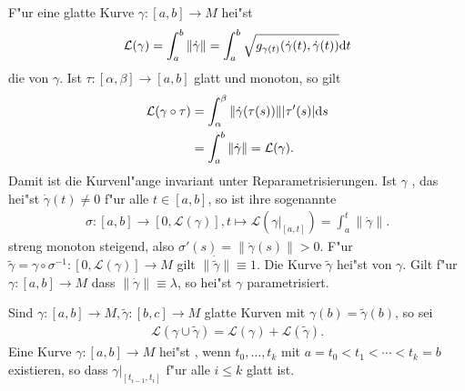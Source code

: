 F"ur eine glatte Kurve $\gamma \colon [a,b] \to M$ hei"st
\begin{align*}
  \mathcal L(\gamma) = \int_{a}^b\|\dot \gamma\| = \int_a^b \sqrt{g_{\gamma(t)}(\dot\gamma(t),\dot\gamma(t))}\mathrm{d} t
\end{align*}
die  von $\gamma$. Ist $\tau \colon [\alpha,\beta] \to [a,b]$ glatt und monoton, so gilt
\begin{align*}
  \mathcal L(\gamma \circ \tau) & = \int_{\alpha}^{\beta}\|\dot\gamma(\tau(s))\||\tau'(s)|\mathrm{d} s\\
  & = \int_a^b\|\dot\gamma\| = \mathcal L(\gamma).
\end{align*}
Damit ist die Kurvenl"ange invariant unter Reparametrisierungen. Ist $\gamma$ , das hei"st $\dot\gamma(t) \neq 0$ f"ur alle $t \in [a,b]$, so ist ihre sogenannte 
\begin{align*}
  \sigma \colon [a,b] \to [0,\mathcal L(\gamma)], t \mapsto \mathcal L(\gamma|_{[a,t]}) = \int_a^t\|\dot\gamma\|.
\end{align*}
streng monoton steigend, also $\sigma'(s) = \|\dot\gamma(s)\| > 0$.
F"ur $\tilde\gamma = \gamma \circ \sigma^{-1}\colon [0,\mathcal L(\gamma)] \to M$ gilt $\|\dot{\tilde\gamma}\| \equiv 1$.
Die Kurve $\tilde \gamma$ hei"st  von $\gamma$.
Gilt f"ur $\gamma \colon [a,b] \to M$ dass $\|\dot\gamma\| \equiv \lambda$, so hei"st $\gamma$  parametrisiert.

Sind $\gamma \colon [a,b] \to M, \tilde \gamma \colon [b,c] \to M$ glatte Kurven mit $\gamma(b) = \tilde \gamma(b)$, so sei
\begin{align*}
  \mathcal L(\gamma \cup \tilde\gamma) = \mathcal L(\gamma) + \mathcal L(\tilde \gamma).
\end{align*}
Eine Kurve $\gamma \colon [a,b] \to M$ hei"st , wenn $t_0, \ldots, t_k$ mit $a = t_0 < t_1 < \cdots < t_k = b$ existieren, so dass $\gamma|_{[t_{i-1},t_i]}$ f"ur alle $i \leq k$ glatt ist.

